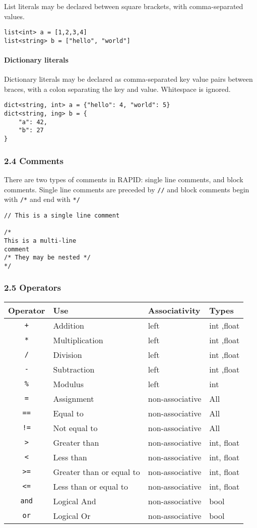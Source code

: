 \documentclass[]{article}
\begin{document}
List literals may be declared between square brackets, with
comma-separated values.

\begin{verbatim}
list<int> a = [1,2,3,4]
list<string> b = ["hello", "world"]
\end{verbatim}

\paragraph{Dictionary literals}\label{dictionary-literals}

Dictionary literals may be declared as comma-separated key value pairs
between braces, with a colon separating the key and value. Whitespace is
ignored.

\begin{verbatim}
dict<string, int> a = {"hello": 4, "world": 5}
dict<string, ing> b = {
    "a": 42,
    "b": 27
}
\end{verbatim}

\subsubsection{2.4 Comments}\label{comments}

There are two types of comments in RAPID: single line comments, and
block comments. Single line comments are preceded by \texttt{//} and
block comments begin with \texttt{/*} and end with \texttt{*/}

\begin{verbatim}
// This is a single line comment

/*
This is a multi-line
comment
/* They may be nested */
*/
\end{verbatim}

\subsubsection{2.5 Operators}\label{operators}

\begin{longtable}[c]{@{}clll@{}}
\toprule
Operator & Use & Associativity & Types\tabularnewline
\midrule
\endhead
\texttt{+} & Addition & left & int ,float\tabularnewline
\texttt{*} & Multiplication & left & int ,float\tabularnewline
\texttt{/} & Division & left & int ,float\tabularnewline
\texttt{-} & Subtraction & left & int ,float\tabularnewline
\texttt{\%} & Modulus & left & int\tabularnewline
\texttt{=} & Assignment & non-associative & All\tabularnewline
\texttt{==} & Equal to & non-associative & All\tabularnewline
\texttt{!=} & Not equal to & non-associative & All\tabularnewline
\texttt{\textgreater{}} & Greater than & non-associative & int,
float\tabularnewline
\texttt{\textless{}} & Less than & non-associative & int,
float\tabularnewline
\texttt{\textgreater{}=} & Greater than or equal to & non-associative &
int, float\tabularnewline
\texttt{\textless{}=} & Less than or equal to & non-associative & int,
float\tabularnewline
\texttt{and} & Logical And & non-associative & bool\tabularnewline
\texttt{or} & Logical Or & non-associative & bool\tabularnewline
\bottomrule
\end{longtable}
\end{document}

